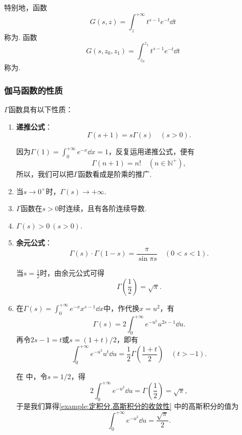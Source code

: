 特别地，函数\[
G(s,z) = \int_z^{+\infty} t^{s-1} e^{-t} \dd{t}
\]称为.
函数\[
G(s,z_0,z_1) = \int_{z_0}^{z_1} t^{s-1} e^{-t} \dd{t}
\]称为.

\subsubsection{伽马函数的性质}
\begin{property}
\(\Gamma\)函数具有以下性质：
\begin{enumerate}
\item {\bf 递推公式}：\begin{equation}
\Gamma(s+1) = s \Gamma(s) \quad (s > 0).
\end{equation}

因为\(\Gamma(1) = \int_0^{+\infty} e^{-x} \dd{x} = 1\)，反复运用递推公式，便有\begin{equation}\label{equation:定积分.伽马函数与阶乘的联系}
\Gamma(n+1) = n! \quad (n\in\mathbb{N}^+),
\end{equation}所以，我们可以把\(\Gamma\)函数看成是阶乘的推广.

\item 当\(s\to0^+\)时，\(\Gamma(s) \to +\infty\).

\item \(\Gamma\)函数在\(s > 0\)时连续，且有各阶连续导数.

\item \(\Gamma(s) > 0\ (s>0)\).

\item {\bf 余元公式}：\begin{equation}\label{equation:定积分.余元公式}
\Gamma(s) \cdot \Gamma(1-s) = \frac{\pi}{\sin{\pi s}} \quad (0 < s < 1).
\end{equation}

当\(s = \frac{1}{2}\)时，由余元公式可得\begin{equation}
\Gamma\left(\frac{1}{2}\right) = \sqrt{\pi}.
\end{equation}

\item 在\(\Gamma(s) = \int_0^{+\infty} e^{-x} x^{s-1} \dd{x}\)中，作代换\(x = u^2\)，有\begin{equation}\label{equation:定积分.伽马函数.中间步骤1}
\Gamma(s) = 2 \int_0^{+\infty} e^{-u^2} u^{2s-1} \dd{u}.
\end{equation}
再令\(2s-1 = t\)或\(s = (1+t)/2\)，即有\begin{equation}
\int_0^{+\infty} e^{-u^2} u^t \dd{u}
= \frac{1}{2} \Gamma\left(\frac{1+t}{2}\right)
\quad (t > -1).
\end{equation}

在  中，令\(s=1/2\)，得\[
2\int_0^{+\infty} e^{-u^2} \dd{u}
= \Gamma\left(\frac{1}{2}\right)
= \sqrt{\pi},
\]
于是我们算得\cref{example:定积分.高斯积分的收敛性} 中的高斯积分的值为
\begin{equation}
\int_0^{+\infty} e^{-u^2} \dd{u} = \frac{\sqrt{\pi}}{2}.
\end{equation}
\end{enumerate}
\end{property}

